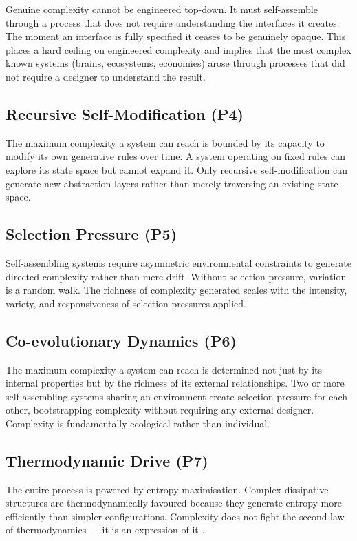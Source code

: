 \documentclass[12pt,a4paper]{article}
\begin{document}
Genuine complexity cannot be engineered top-down.
It must self-assemble through a process that does not require
understanding the interfaces it creates.
The moment an interface is fully specified it ceases to be genuinely
opaque.
This places a hard ceiling on engineered complexity and implies that
the most complex known systems (brains, ecosystems, economies) arose
through processes that did not require a designer to understand the
result.

\subsection{Recursive Self-Modification (P4)}

The maximum complexity a system can reach is bounded by its capacity
to modify its own generative rules over time.
A system operating on fixed rules can explore its state space but
cannot expand it.
Only recursive self-modification can generate new abstraction layers
rather than merely traversing an existing state space.

\subsection{Selection Pressure (P5)}

Self-assembling systems require asymmetric environmental constraints
to generate directed complexity rather than mere drift.
Without selection pressure, variation is a random walk.
The richness of complexity generated scales with the intensity,
variety, and responsiveness of selection pressures applied.

\subsection{Co-evolutionary Dynamics (P6)}

The maximum complexity a system can reach is determined not just by its
internal properties but by the richness of its external relationships.
Two or more self-assembling systems sharing an environment create
selection pressure for each other, bootstrapping complexity without
requiring any external designer.
Complexity is fundamentally ecological rather than individual.

\subsection{Thermodynamic Drive (P7)}

The entire process is powered by entropy maximisation.
Complex dissipative structures \citep{prigogine1977} are
thermodynamically favoured because they generate entropy more efficiently
than simpler configurations.
Complexity does not fight the second law of thermodynamics — it is an
expression of it \citep{england2013}.
\end{document}
